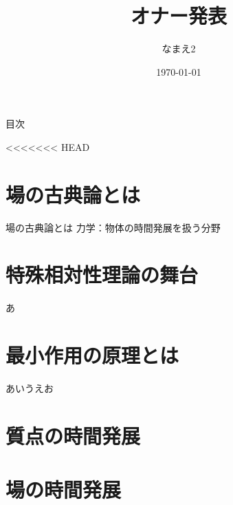 \documentclass[unicode, lualatex, aspectratio=169, 10.5pt]{beamer}
\title[オナー発表]{オナー発表} %
\author[なまえ1]{なまえ2}     %
\institute[A]{B}              %
\date{\today}                 %
\begin{document}
\begin{frame}
  \titlepage
\end{frame}

\begin{frame}{目次}
  \tableofcontents
\end{frame}

<<<<<<< HEAD
\section{場の古典論とは}

\begin{frame}{場の古典論とは}
  力学：物体の時間発展を扱う分野
\end{frame}



\section{特殊相対性理論の舞台}

\begin{frame}
  あ
\end{frame}



\section{最小作用の原理とは}

\begin{frame}
  あいうえお
\end{frame}


\section{質点の時間発展}



\section{場の時間発展}
\end{document}
